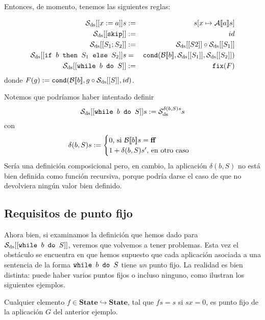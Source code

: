 Entonces, de momento, tenemos las siguientes reglas: 

\begin{sist*}[$\nn{While}_\nn{ds}$]\label{whileds}
\begin{eqnarray*}
    \mathcal{S}_{\mathrm{ds}} [[x:=a]]s &:=& s[x\mapsto \mathcal{A}[\![a]\!]s] \\
    \mathcal{S}_{\mathrm{ds}} [[\texttt{skip}]] &:=& id \\
    \mathcal{S}_{\mathrm{ds}} [[S_1;S_2]] &:=& \mathcal{S}_{\mathrm{ds}} [[S2]] \circ \mathcal{S}_{\mathrm{ds}} [[S_1]] \\
    \mathcal{S}_{\mathrm{ds}} [[\texttt{if } b\texttt{ then } S_1\texttt{ else } S_2]]s &=&  \texttt{cond}(\mathcal{B}[\![b]\!], \mathcal{S}_{\mathrm{ds}} [[S_1]], \mathcal{S}_{\mathrm{ds}} [[S_2]])\\
    \mathcal{S}_{\mathrm{ds}} [[\texttt{while } b \texttt{ do } S]] &:=&  \texttt{fix}(F)\\
\end{eqnarray*}
donde $F(g) := \texttt{cond}(\mathcal{B}[\![b]\!], g\circ \mathcal{S}_{\mathrm{ds}}[[S]], id)$.
\end{sist*}

\begin{example}

Notemos que podríamos haber intentado definir 
$$\mathcal{S}_{\mathrm{ds}}[[\texttt{while } b \texttt{ do } S]]s := \mathcal{S}_{\mathrm{ds}}^{\delta(b, S)s}s$$
con 
$$\delta(b, S)s := \begin{cases}
    0 \text{, si } \mathcal{B}[\![b]\!]s = \mathbf{ff} \\
    1 + \delta(b, S)s' \text{, en otro caso}
\end{cases}$$
Sería una definición composicional pero, en cambio, la aplicación $\delta(b, S)$ no está bien definida como función recursiva, porque podría darse el caso de que no devolviera ningún valor bien definido.

\end{example}
\subsection{Requisitos de punto fijo}

Ahora bien, si examinamos la definición que hemos dado para $\mathcal{S}_{\mathrm{ds}} [[\texttt{while } b \texttt{ do } S]]$, veremos que volvemos a tener problemas. Esta vez el obstáculo se encuentra en que hemos supuesto que cada aplicación asociada a una sentencia de la forma $\texttt{while } b \texttt{ do } S$ tiene \textit{un} punto fijo. La realidad es bien distinta: puede haber varios puntos fijos o incluso ninguno, como ilustran los siguientes ejemplos.

\begin{example}
Cualquier elemento $f \in  \mathbf{State}\hookrightarrow \mathbf{State}$, tal que $fs =s$ si $sx = 0$, es punto fijo de la aplicación $G$ del anterior ejemplo.
\end{example}

